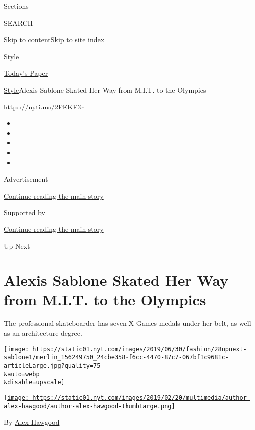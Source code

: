 Sections

SEARCH

\protect\hyperlink{site-content}{Skip to
content}\protect\hyperlink{site-index}{Skip to site index}

\href{https://www.nytimes.com/section/style}{Style}

\href{https://myaccount.nytimes.com/auth/login?response_type=cookie\&client_id=vi}{}

\href{https://www.nytimes.com/section/todayspaper}{Today's Paper}

\href{/section/style}{Style}\textbar{}Alexis Sablone Skated Her Way from
M.I.T. to the Olympics

\href{https://nyti.ms/2FEKF3r}{https://nyti.ms/2FEKF3r}

\begin{itemize}
\item
\item
\item
\item
\item
\end{itemize}

Advertisement

\protect\hyperlink{after-top}{Continue reading the main story}

Supported by

\protect\hyperlink{after-sponsor}{Continue reading the main story}

Up Next

\hypertarget{alexis-sablone-skated-her-way-from-mit-to-the-olympics}{%
\section{Alexis Sablone Skated Her Way from M.I.T. to the
Olympics}\label{alexis-sablone-skated-her-way-from-mit-to-the-olympics}}

The professional skateboarder has seven X-Games medals under her belt,
as well as an architecture degree.

\texttt{[image: https://static01.nyt.com/images/2019/06/30/fashion/28upnext-sablone1/merlin\_156249750\_24cbe358-f6cc-4470-87c7-067bf1c9681c-articleLarge.jpg?quality=75\\\&auto=webp\\\&disable=upscale]}

\href{https://www.nytimes.com/by/alex-hawgood}{\texttt{[image: https://static01.nyt.com/images/2019/02/20/multimedia/author-alex-hawgood/author-alex-hawgood-thumbLarge.png]}}

By \href{https://www.nytimes.com/by/alex-hawgood}{Alex Hawgood}

